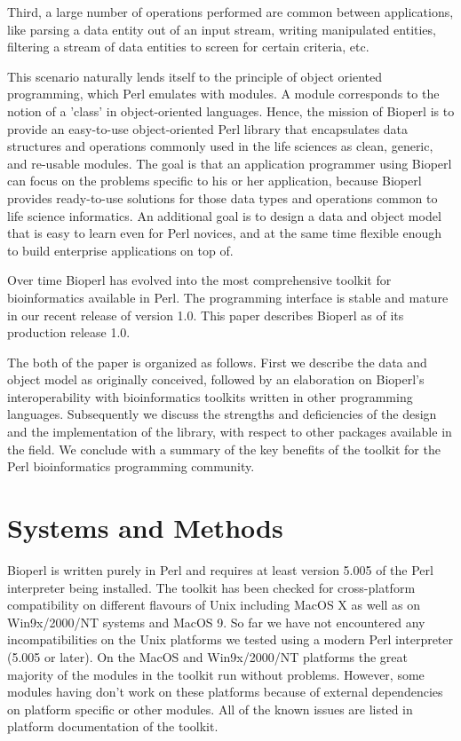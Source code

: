 \documentclass[12pt]{article}
\begin{document}
Third, a large number of operations performed are common between
applications, like parsing a data entity out of an input stream,
writing manipulated entities, filtering a stream of data entities to
screen for certain criteria, etc. 

This scenario naturally lends itself to the principle of object
oriented programming, which Perl emulates with modules.  A module
corresponds to the notion of a 'class' in object-oriented languages.
Hence, the mission of Bioperl is to provide an easy-to-use
object-oriented Perl library that encapsulates data structures and
operations commonly used in the life sciences as clean, generic, and
re-usable modules.  The goal is that an application programmer using
Bioperl can focus on the problems specific to his or her application,
because Bioperl provides ready-to-use solutions for those data
types and operations common to life science informatics.  An additional
goal is to design a data and object model that is easy to learn
even for Perl novices, and at the same time flexible enough to build
enterprise applications on top of.

Over time Bioperl has evolved into the most comprehensive toolkit for
bioinformatics available in Perl.  The programming interface is stable
and mature in our recent release of version 1.0.  This paper
describes Bioperl as of its production release 1.0.

The both of the paper is organized as follows.  First we describe the
data and object model as originally conceived, followed by an
elaboration on Bioperl's interoperability with bioinformatics toolkits
written in other programming languages.  Subsequently we discuss the
strengths and deficiencies of the design and the implementation of the
library, with respect to other packages available in the field.  We
conclude with a summary of the key benefits of the toolkit for the
Perl bioinformatics programming community.

\section{Systems and Methods}

Bioperl is written purely in Perl and requires at least version 5.005
of the Perl interpreter being installed.  The toolkit has been checked
for cross-platform compatibility on different flavours of Unix
including MacOS X as well as on Win9x/2000/NT systems and MacOS 9.  So
far we have not encountered any incompatibilities on the Unix
platforms we tested using a modern Perl interpreter (5.005 or later).
On the MacOS and Win9x/2000/NT platforms the great majority of the
modules in the toolkit run without problems.  However, some modules
having don't work on these platforms because of external dependencies
on platform specific or other modules.  All of the known issues are
listed in platform documentation of the toolkit.
\end{document}
